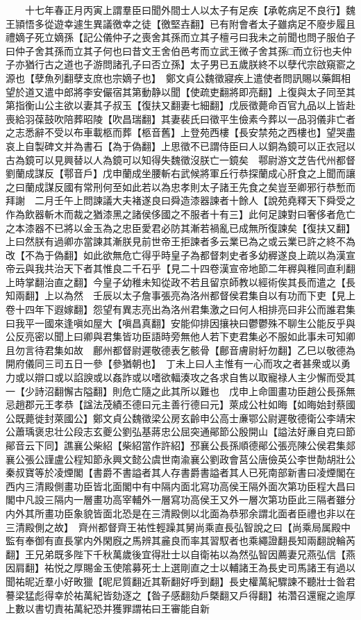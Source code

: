 　　十七年春正月丙寅上謂羣臣曰聞外間士人以太子有足疾【承乾病足不良行】魏王頴悟多從遊幸遽生異議徼幸之徒【徼堅壵翻】已有附會者太子雖病足不廢步履且禮嫡子死立嫡孫【記公儀仲子之喪舍其孫而立其子檀弓曰我未之前聞也問子服伯子曰仲子舍其孫而立其子何也曰昔文王舍伯邑考而立武王微子舍其孫□而立衍也夫仲子亦猶行古之道也子游問諸孔子曰否立孫】太子男已五歲朕終不以孽代宗啟窺窬之源也【孽魚列翻孽支庶也宗嫡子也】　鄭文貞公魏徵寢疾上遣使者問訊賜以藥餌相望於道又遣中郎將李安儼宿其第動静以聞【使疏吏翻將即亮翻】上復與太子同至其第指衡山公主欲以妻其子叔玉【復扶又翻妻七細翻】戊辰徵薨命百官九品以上皆赴喪給羽葆鼓吹陪葬昭陵【吹昌瑞翻】其妻裴氏曰徵平生儉素今葬以一品羽儀非亡者之志悉辭不受以布車載柩而葬【柩音舊】上登苑西樓【長安禁苑之西樓也】望哭盡哀上自製碑文并為書石【為于偽翻】上思徵不已謂侍臣曰人以銅為鏡可以正衣冠以古為鏡可以見興替以人為鏡可以知得失魏徵沒朕亡一鏡矣　鄠尉游文芝告代州都督劉蘭成謀反【鄠音戶】戊申蘭成坐腰斬右武候將軍丘行恭探蘭成心肝食之上聞而讓之曰蘭成謀反國有常刑何至如此若以為忠孝則太子諸王先食之矣豈至卿邪行恭慙而拜謝　二月壬午上問諫議大夫褚遂良曰舜造漆器諫者十餘人【說苑堯釋天下舜受之作為飲器斬木而裁之猶漆黑之諸侯侈國之不服者十有三】此何足諫對曰奢侈者危亡之本漆器不已將以金玉為之忠臣愛君必防其漸若禍亂已成無所復諫矣【復扶又翻】上曰然朕有過卿亦當諫其漸朕見前世帝王拒諫者多云業已為之或云業已許之終不為改【不為于偽翻】如此欲無危亡得乎時皇子為都督刺史者多幼稺遂良上疏以為漢宣帝云與我共治天下者其惟良二千石乎【見二十四卷漢宣帝地節二年稺與稚同直利翻上時掌翻治直之翻】今皇子幼稚未知從政不若且留京師教以經術俟其長而遣之【長知兩翻】上以為然　壬辰以太子詹事張亮為洛州都督侯君集自以有功而下吏【見上卷十四年下遐嫁翻】怨望有異志亮出為洛州君集激之曰何人相排亮曰非公而誰君集曰我平一國來逢嗔如屋大【嗔昌真翻】安能仰排因攘袂曰鬱鬱殊不聊生公能反乎與公反亮密以聞上曰卿與君集皆功臣語時旁無他人若下吏君集必不服如此事未可知卿且勿言待君集如故　鄜州都督尉遲敬德表乞骸骨【鄜音膚尉紆勿翻】乙巳以敬德為開府儀同三司五日一參【參猶朝也】　丁未上曰人主惟有一心而攻之者甚衆或以勇力或以辯口或以諂諛或以姦詐或以嗜欲輻湊攻之各求自售以取寵禄人主少懈而受其一【少詩沼翻懈古隘翻】則危亡隨之此其所以難也　戊申上命圖畫功臣趙公長孫無忌趙郡元王孝恭【諡法茂績丕德曰元主善行德曰元】萊成公杜如晦【如晦始封蔡國公既薨徙封萊國公】鄭文貞公魏徵梁公房玄齡申公高士亷鄂公尉遲敬德衛公李靖宋公蕭瑀褒忠壮公段志玄夔公劉弘基蔣忠公屈突通鄖節公殷開山【謚法好亷自克曰節鄖音云下同】譙襄公柴紹【柴紹當作許紹】邳襄公長孫順德鄖公張亮陳公侯君集郯襄公張公謹盧公程知節永興文懿公虞世南渝襄公劉政會莒公唐儉英公李世勣胡壯公秦叔寶等於凌煙閣【書爵不書謚者其人存書爵書謚者其人已死南部新書曰凌煙閣在西内三清殿側畫功臣皆北面閣中有中隔内面北寫功高侯王隔外面次第功臣程大昌曰閣中凡設三隔内一層畫功高宰輔外一層寫功高侯王又外一層次第功臣此三隔者雖分内外其所畫功臣象貌皆面北恐是在三清殿側以北面為恭邪余謂北面者臣禮也非以在三清殿側之故】　齊州都督齊王祐性輕躁其舅尚乘直長弘智說之曰【尚乘局属殿中監有奉御有直長掌内外閑廐之馬辨其麄良而率其習馭者也乘繩證翻長知兩翻說輪芮翻】王兄弟既多陛下千秋萬歲後宜得壯士以自衛祐以為然弘智因薦妻兄燕弘信【燕因肩翻】祐悦之厚賜金玉使隂募死士上選剛直之士以輔諸王為長史司馬諸王有過以聞祐昵近羣小好畋獵【昵尼質翻近其靳翻好呼到翻】長史權萬紀驟諫不聽壯士昝君謩梁猛彪得幸於祐萬紀皆劾逐之【昝子感翻劾戶槩翻又戶得翻】祐濳召還寵之逾厚上數以書切責祐萬紀恐并獲罪謂祐曰王審能自新